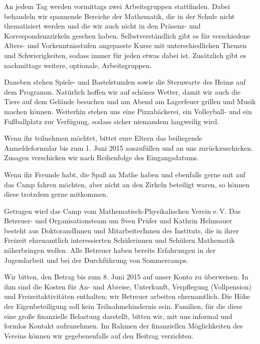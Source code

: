\documentclass[12pt]{zettel}
\begin{document}
An jedem Tag werden vormittags zwei Arbeitsgruppen stattfinden. Dabei behandeln wir spannende
Bereiche der Mathematik, die in der Schule nicht thematisiert werden und die
wir auch nicht in den Präsenz- und Korrespondenzzirkeln gesehen haben.
Selbstverständlich gibt es für verschiedene Alters- und Vorkenntnisstufen angepasste Kurse
mit unterschiedlichen Themen und Schwierigkeiten, sodass immer für jeden
etwas dabei ist. Zusätzlich gibt es nachmittags weitere, optionale,
Arbeitsgruppen.

Daneben stehen Spiele- und Bastelstunden sowie die
Sternwarte des Heims auf dem Programm. Natürlich hoffen wir auf
schönes Wetter, damit wir auch die Tiere auf dem Gelände besuchen
und am Abend am Lagerfeuer grillen und Musik machen können.
Weiterhin stehen uns eine Pizzabäckerei, ein Volleyball- und ein
Fußballplatz zur Verfügung, sodass sicher niemandem langweilig
wird.

\vspace{\medskipamount}

\begin{minipage}{0.63\textwidth}
Wenn ihr teilnehmen möchtet, bittet eure Eltern das beiliegende Anmeldeformular
bis zum 1. Juni 2015 auszufüllen und an uns zurückzuschicken. Zusagen
verschicken wir nach Reihenfolge des Eingangsdatums.
\end{minipage}

\vspace{\medskipamount}

\begin{minipage}{0.4\textwidth}
Wenn ihr Freunde
habt, die Spaß an Mathe haben und ebenfalls gerne mit auf das
Camp fahren möchten, aber nicht an den Zirkeln beteiligt waren, so
können diese trotzdem gerne mitkommen.
\end{minipage}

\newpage

Getragen wird das Camp vom Mathematisch-Physikalischen Verein e.\,V. Das
Betreuer- und Organisationsteam um Sven Prüfer und Kathrin Helmsauer besteht
aus DoktorandInnen und MitarbeiterInnen des Instituts, die in ihrer Freizeit
ehrenamtlich interessierten Schülerinnen und Schülern Mathematik näherbringen
wollen. Alle Betreuer haben
bereits Erfahrungen in der Jugendarbeit und bei der Durch\-füh\-rung von
Sommercamps.

Wir bitten, den Betrag bis zum 8. Juni 2015 auf unser Konto zu überweisen.
In ihm sind die Kosten für An- und Abreise, Unterkunft, Verpflegung
(Vollpension) und Freizeitaktivitäten enthalten; wir Betreuer arbeiten
ehrenamtlich. Die Höhe der Eigenbeteiligung soll kein Teilnahmehindernis sein.
Familien, für die diese eine große finanzielle Belastung darstellt, bitten wir,
mit uns informal und formlos Kontakt aufzunehmen. Im Rahmen der finanziellen Möglichkeiten des
Vereins können wir gegebenenfalls auf den Beitrag verzichten.
\end{document}
